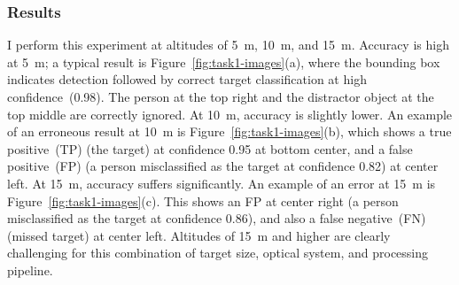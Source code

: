 \subsubsection{Results}
\label{sec:task1-results}

I perform this experiment at altitudes of 5~m, 10~m, and 15~m.
Accuracy is high at 5~m; a typical result is
Figure~\ref{fig:task1-images}(a), where the bounding box indicates
detection followed by correct target classification at high
confidence~(0.98).  The person at the top right and the distractor
object at the top middle are correctly ignored.  At 10~m, accuracy is
slightly lower.  An example of an erroneous result at 10~m is
Figure~\ref{fig:task1-images}(b), which shows a true positive~(TP)
(the target) at confidence 0.95 at bottom center, and a false
positive~(FP) (a person misclassified as the target at confidence
0.82) at center left.  At 15~m, accuracy suffers significantly.  An
example of an error at 15~m is Figure~\ref{fig:task1-images}(c).  This
shows an FP at center right (a person misclassified as the
target at confidence 0.86), and also a false negative~(FN) (missed target)
at center left.  Altitudes of 15~m and higher are clearly challenging
for this combination of target size, optical system, and processing pipeline.

